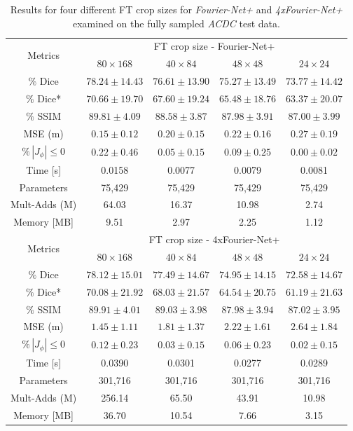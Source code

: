 \documentclass[english,version-2022-01]{uzl-thesis} %
\begin{document}
\begin{table}[h] %
	\centering
	\caption{Results for four different FT crop sizes for \emph{Fourier-Net+} and \emph{4xFourier-Net+} examined on the fully sampled \emph{ACDC} test data.}
	\label{tab:FTCropSize}
	\begin{tabular}{c c c c c} %
		\toprule
		\multirow{2}{*}{Metrics} & \multicolumn{4}{c}{FT crop size - Fourier-Net+} \\
		\cline{2-5}
		 & $80 \times 168$ & $40 \times 84$ & $48 \times 48$ & $24 \times 24$ \\		
		\midrule
		$\%$ Dice & $78.24 \pm 14.43$ & $76.61 \pm 13.90$ & $75.27 \pm 13.49$ & $73.77 \pm 14.42$ \\
		$\%$ Dice* & $70.66 \pm 19.70$ & $67.60 \pm 19.24$ & $65.48 \pm 18.76$ & $63.37 \pm 20.07$ \\
		$\%$ SSIM & $89.81 \pm 4.09$ & $88.58 \pm 3.87$ & $87.98 \pm 3.91$ & $87.00 \pm 3.99$ \\
		MSE (m) & $0.15 \pm 0.12$ & $0.20 \pm 0.15$ & $0.22 \pm 0.16$ & $0.27 \pm 0.19$ \\
		$\% \, |J_{\phi}|\leq0$ & $0.22 \pm 0.46$ & $0.05 \pm 0.15$ & $0.09 \pm 0.25$ & $0.00 \pm 0.02$ \\		
		Time [s] 	  & 0.0158 & 0.0077 & 0.0079 & 0.0081 \\
		Parameters 	  & 75,429 & 75,429 & 75,429 & 75,429 \\
		Mult-Adds (M) & 64.03  & 16.37  & 10.98  & 2.74 \\
		Memory [MB] 	  & 9.51   & 2.97   & 2.25   & 1.12 \\
		\midrule
		\multirow{2}{*}{Metrics} & \multicolumn{4}{c}{FT crop size - 4xFourier-Net+} \\
		\cline{2-5}
		 & $80 \times 168$ & $40 \times 84$ & $48 \times 48$ & $24 \times 24$ \\		
		\midrule
		$\%$ Dice & $78.12 \pm 15.01$ & $77.49 \pm 14.67$ & $74.95 \pm 14.15$ & $72.58 \pm 14.67$ \\
		$\%$ Dice* & $70.08 \pm 21.92$ & $68.03 \pm 21.57$ & $64.54 \pm 20.75$ & $61.19 \pm 21.63$ \\
		$\%$ SSIM & $89.91 \pm 4.01$ & $89.03 \pm 3.98$ & $87.98 \pm 3.94$ & $87.02 \pm 3.95$ \\
		MSE (m) & $1.45 \pm 1.11$ & $1.81 \pm 1.37$ & $2.22 \pm 1.61$ & $2.64 \pm 1.84$ \\
		$\% \, |J_{\phi}|\leq0$ & $0.12 \pm 0.23$ & $0.03 \pm 0.15$ & $0.06 \pm 0.23$ & $0.02 \pm 0.15$ \\	
		Time [s] 	 & 0.0390  & 0.0301  & 0.0277  & 0.0289 \\
		Parameters 	 & 301,716 & 301,716 & 301,716 & 301,716 \\
		Mult-Adds (M)& 256.14  & 65.50   & 43.91   & 10.98 \\
		Memory [MB] 	 & 36.70   & 10.54   & 7.66    & 3.15 \\
		\bottomrule
	\end{tabular}
\end{table}
\end{document}
